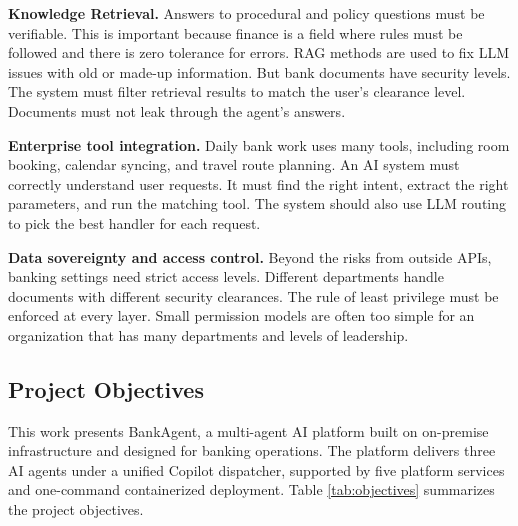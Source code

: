 \textbf{Knowledge Retrieval.} Answers to procedural and policy questions must be verifiable. This is important because finance is a field where rules must be followed and there is zero tolerance for errors. RAG methods are used to fix LLM issues with old or made-up information. But bank documents have security levels. The system must filter retrieval results to match the user's clearance level. Documents must not leak through the agent's answers.

\textbf{Enterprise tool integration.} Daily bank work uses many tools, including room booking, calendar syncing, and travel route planning. An AI system must correctly understand user requests. It must find the right intent, extract the right parameters, and run the matching tool. The system should also use LLM routing to pick the best handler for each request.

\textbf{Data sovereignty and access control.} Beyond the risks from outside APIs, banking settings need strict access levels. Different departments handle documents with different security clearances. The rule of least privilege must be enforced at every layer. Small permission models are often too simple for an organization that has many departments and levels of leadership.

\subsection{Project Objectives}

This work presents BankAgent, a multi-agent AI platform built on on-premise infrastructure and designed for banking operations. The platform delivers three AI agents under a unified Copilot dispatcher, supported by five platform services and one-command containerized deployment. Table \ref{tab:objectives} summarizes the project objectives.

